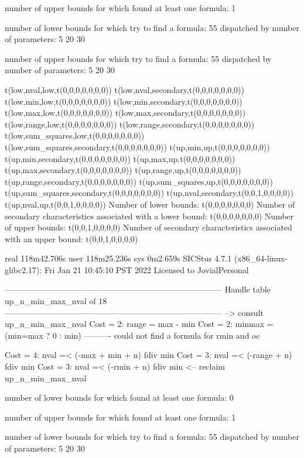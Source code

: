 number of upper bounds for which found at least one formula: 1

number of lower bounds for which try to find a formula: 55
dispatched by number of parameters: 5  20  30

number of upper bounds for which try to find a formula: 55
dispatched by number of parameters: 5  20  30

t(low,nval,low,t(0,0,0,0,0,0,0))
t(low,nval,secondary,t(0,0,0,0,0,0,0))
t(low,min,low,t(0,0,0,0,0,0,0))
t(low,min,secondary,t(0,0,0,0,0,0,0))
t(low,max,low,t(0,0,0,0,0,0,0))
t(low,max,secondary,t(0,0,0,0,0,0,0))
t(low,range,low,t(0,0,0,0,0,0,0))
t(low,range,secondary,t(0,0,0,0,0,0,0))
t(low,sum_squares,low,t(0,0,0,0,0,0,0))
t(low,sum_squares,secondary,t(0,0,0,0,0,0,0))
t(up,min,up,t(0,0,0,0,0,0,0))
t(up,min,secondary,t(0,0,0,0,0,0,0))
t(up,max,up,t(0,0,0,0,0,0,0))
t(up,max,secondary,t(0,0,0,0,0,0,0))
t(up,range,up,t(0,0,0,0,0,0,0))
t(up,range,secondary,t(0,0,0,0,0,0,0))
t(up,sum_squares,up,t(0,0,0,0,0,0,0))
t(up,sum_squares,secondary,t(0,0,0,0,0,0,0))
t(up,nval,secondary,t(0,0,1,0,0,0,0))
t(up,nval,up,t(0,0,1,0,0,0,0))
Number of lower bounds:                                             t(0,0,0,0,0,0,0)
Number of secondary characteristics associated with a lower bound:  t(0,0,0,0,0,0,0)
Number of upper bounds:                                             t(0,0,1,0,0,0,0)
Number of secondary characteristics associated with an upper bound: t(0,0,1,0,0,0,0)

real	118m42.706s
user	118m25.236s
sys	0m2.659s
SICStus 4.7.1 (x86_64-linux-glibc2.17): Fri Jan 21 10:45:10 PST 2022
Licensed to JovialPersonal


--------------------------------------------------------------------------------
Handle table up_n_min_max_nval of 18
--------------------------------------------------------------------------------
--> consult up_n_min_max_nval
Cost =  2:  range  = max - min
Cost =  2:  minmax = (min=max ? 0 : min)
----------
could not find a formula for rmin and oc

Cost =  4:  nval =< (-max + min + n) fdiv min
Cost =  3:  nval =< (-range + n) fdiv min
Cost =  3:  nval =< (-rmin + n) fdiv min
<-- reclaim up_n_min_max_nval

number of lower bounds for which found at least one formula: 0

number of upper bounds for which found at least one formula: 1

number of lower bounds for which try to find a formula: 55
dispatched by number of parameters: 5  20  30

